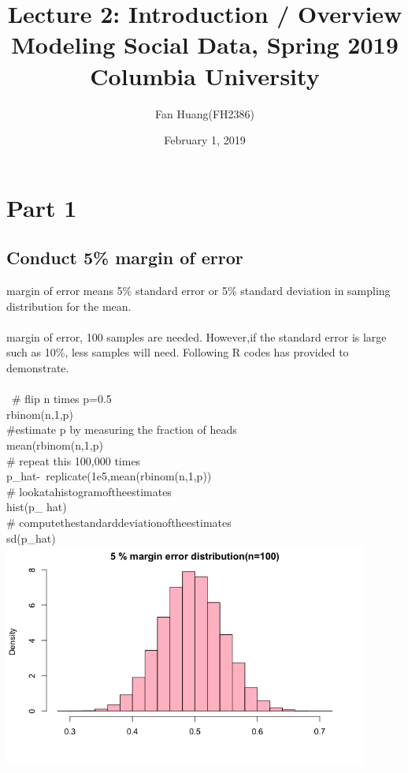 \documentclass[12pt]{extarticle}
\title{
Lecture 2: Introduction / Overview \\  %
Modeling Social Data, Spring 2019 \\   %
Columbia University                    %
}
\author{Fan Huang(FH2386)}                     %
\date{February 1, 2019}                %
\newcommand{\<}{\langle}
\renewcommand{\>}{\rangle}
\theoremstyle{definition}
\begin{document}
\maketitle

\section{Part 1}
\subsection{Conduct 5\% margin of error}
\begin{notes}
 margin of error means 5\% standard error or 5\% standard deviation in sampling distribution for the mean.
\\\\
 margin of error, 100 samples are needed. However,if the standard error is large such as 10\%, less samples will need. Following R codes has provided to demonstrate.\\\\
\ \# flip n times p=0.5
\\rbinom(n,1,p)\\
\#estimate p by measuring the fraction of heads \\
mean(rbinom(n,1,p)\\
\# repeat this 100,000 times\\
 p\_hat\<-\ replicate(1e5,mean(rbinom(n,1,p))\\
 \# look\enspace at\enspace a\enspace histogram\enspace of\enspace the\enspace estimates\\
 hist(p\_ hat)\\
 \# compute\enspace the\enspace standard\enspace deviation\enspace of\enspace the\enspace estimates\\
sd(p\_hat)\\

\includegraphics[width=12cm]{ddg}

\end{notes}
\end{document}
